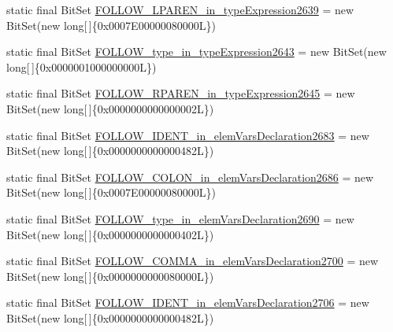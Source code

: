 \begin{DoxyCompactItemize}
\item 
static final Bit\-Set \hyperlink{classorg_1_1tzi_1_1use_1_1parser_1_1testsuite_1_1_test_suite_parser_a5884915cc872602ea8cfafc79c6e564f}{F\-O\-L\-L\-O\-W\-\_\-\-L\-P\-A\-R\-E\-N\-\_\-in\-\_\-type\-Expression2639} = new Bit\-Set(new long\mbox{[}$\,$\mbox{]}\{0x0007\-E00000080000\-L\})
\item 
static final Bit\-Set \hyperlink{classorg_1_1tzi_1_1use_1_1parser_1_1testsuite_1_1_test_suite_parser_a022caf5dcc615a834d49f2fbb94e63ef}{F\-O\-L\-L\-O\-W\-\_\-type\-\_\-in\-\_\-type\-Expression2643} = new Bit\-Set(new long\mbox{[}$\,$\mbox{]}\{0x0000001000000000\-L\})
\item 
static final Bit\-Set \hyperlink{classorg_1_1tzi_1_1use_1_1parser_1_1testsuite_1_1_test_suite_parser_a6044f294948e9e2dac5b4b7cd2303a0e}{F\-O\-L\-L\-O\-W\-\_\-\-R\-P\-A\-R\-E\-N\-\_\-in\-\_\-type\-Expression2645} = new Bit\-Set(new long\mbox{[}$\,$\mbox{]}\{0x0000000000000002\-L\})
\item 
static final Bit\-Set \hyperlink{classorg_1_1tzi_1_1use_1_1parser_1_1testsuite_1_1_test_suite_parser_ab1f03754e678c0b4aaf020f8ddcadadf}{F\-O\-L\-L\-O\-W\-\_\-\-I\-D\-E\-N\-T\-\_\-in\-\_\-elem\-Vars\-Declaration2683} = new Bit\-Set(new long\mbox{[}$\,$\mbox{]}\{0x0000000000000482\-L\})
\item 
static final Bit\-Set \hyperlink{classorg_1_1tzi_1_1use_1_1parser_1_1testsuite_1_1_test_suite_parser_a2ea2f012d6cd163b883b53b6a0ab5404}{F\-O\-L\-L\-O\-W\-\_\-\-C\-O\-L\-O\-N\-\_\-in\-\_\-elem\-Vars\-Declaration2686} = new Bit\-Set(new long\mbox{[}$\,$\mbox{]}\{0x0007\-E00000080000\-L\})
\item 
static final Bit\-Set \hyperlink{classorg_1_1tzi_1_1use_1_1parser_1_1testsuite_1_1_test_suite_parser_aff6b006e75136b7cdaf310aab18a5f81}{F\-O\-L\-L\-O\-W\-\_\-type\-\_\-in\-\_\-elem\-Vars\-Declaration2690} = new Bit\-Set(new long\mbox{[}$\,$\mbox{]}\{0x0000000000000402\-L\})
\item 
static final Bit\-Set \hyperlink{classorg_1_1tzi_1_1use_1_1parser_1_1testsuite_1_1_test_suite_parser_a7785be0390a5193b37d832357b785477}{F\-O\-L\-L\-O\-W\-\_\-\-C\-O\-M\-M\-A\-\_\-in\-\_\-elem\-Vars\-Declaration2700} = new Bit\-Set(new long\mbox{[}$\,$\mbox{]}\{0x0000000000080000\-L\})
\item 
static final Bit\-Set \hyperlink{classorg_1_1tzi_1_1use_1_1parser_1_1testsuite_1_1_test_suite_parser_a83c4d854fbe378ec032c17bbcfc044ca}{F\-O\-L\-L\-O\-W\-\_\-\-I\-D\-E\-N\-T\-\_\-in\-\_\-elem\-Vars\-Declaration2706} = new Bit\-Set(new long\mbox{[}$\,$\mbox{]}\{0x0000000000000482\-L\})

\end{DoxyCompactItemize}
